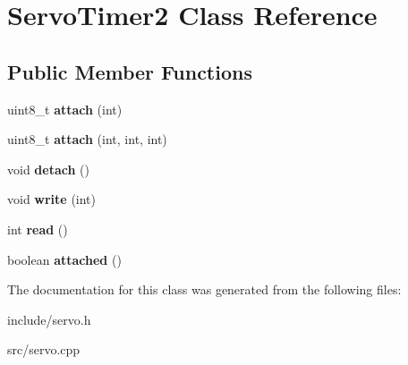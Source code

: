 \hypertarget{classServoTimer2}{}\section{Servo\+Timer2 Class Reference}
\label{classServoTimer2}
\subsection*{Public Member Functions}
\begin{DoxyCompactItemize}
\item 
\mbox{\label{classServoTimer2_ac159e8599eeddbab857e63060825a788}} 
uint8\+\_\+t {\bfseries attach} (int)
\item 
\mbox{\label{classServoTimer2_a6778a02aa53ebf3daf7faa9eaa2b5a84}} 
uint8\+\_\+t {\bfseries attach} (int, int, int)
\item 
\mbox{\label{classServoTimer2_a9afafed2c21712396aa9dcfbabcbf8ba}} 
void {\bfseries detach} ()
\item 
\mbox{\label{classServoTimer2_a76383d02fbb23b3d99a1c4ddf3acb2ba}} 
void {\bfseries write} (int)
\item 
\mbox{\label{classServoTimer2_aa1b574d05b6a11160f821ffb4c06f63f}} 
int {\bfseries read} ()
\item 
\mbox{\label{classServoTimer2_a715ff6d1750bee3feed2884d211a7696}} 
boolean {\bfseries attached} ()
\end{DoxyCompactItemize}


The documentation for this class was generated from the following files\+:\begin{DoxyCompactItemize}
\item 
include/servo.\+h\item 
src/servo.\+cpp\end{DoxyCompactItemize}
